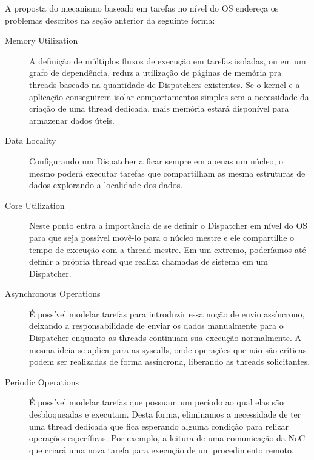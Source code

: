 	A proposta do mecanismo baseado em tarefas no nível do OS endereça os
	problemas descritos na seção anterior da seguinte forma:
	\begin{description}

		\item[Memory Utilization] A definição de múltiplos fluxos de execução
			em tarefas isoladas, ou em um grafo de dependência, reduz
			a utilização de páginas de memória pra threads baseado na quantidade
			de Dispatchers existentes. Se o kernel e a aplicação conseguirem
			isolar comportamentos simples sem a necessidade da criação de uma thread
			dedicada, mais memória estará disponível para armazenar dados úteis.

		\item[Data Locality] Configurando um Dispatcher a ficar sempre em
			apenas um núcleo, o mesmo poderá executar tarefas que compartilham as
			mesma estruturas de dados explorando a localidade dos dados.

		\item[Core Utilization] Neste ponto entra a importância de se definir
			o Dispatcher em nível do OS para que seja possível movê-lo para o
			núcleo mestre e ele compartilhe o tempo de execução com a thread mestre.
			Em um extremo, poderíamos até definir a própria thread que realiza
			chamadas de sistema em um Dispatcher.

		\item[Asynchronous Operations] É possível modelar tarefas para
			introduzir essa noção de envio assíncrono, deixando a
			responsabilidade de enviar os dados manualmente para o Dispatcher
			enquanto as threads continuam sua execução normalmente.
			A mesma ideia se aplica para as syscalls, onde operações que não são
			críticas podem ser realizadas de forma assíncrona, liberando as
			threads solicitantes.

		\item[Periodic Operations] É possível modelar tarefas que possuam um
			período ao qual elas são desbloqueadas e executam. Desta forma,
			eliminamos a necessidade de ter uma thread dedicada que fica
			esperando alguma condição para relizar operações específicas.
			Por exemplo, a leitura de uma comunicação da NoC que criará uma
			nova tarefa para execução de um procedimento remoto.

	\end{description}


